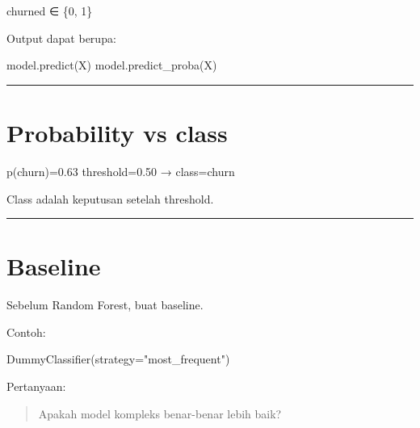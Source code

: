 \documentclass[
  indonesian,
  letterpaper,
  DIV=11,
  numbers=noendperiod]{scrreprt}
\newenvironment{Shaded}{\begin{snugshade}}{\end{snugshade}}
\newcommand{\NormalTok}[1]{\textcolor[rgb]{0.00,0.23,0.31}{#1}}
\newcommand{\OperatorTok}[1]{\textcolor[rgb]{0.37,0.37,0.37}{#1}}
\newcommand{\StringTok}[1]{\textcolor[rgb]{0.13,0.47,0.30}{#1}}
\begin{document}
\begin{Shaded}
\begin{Highlighting}[]
\NormalTok{churned ∈ \{0, 1\}}
\end{Highlighting}
\end{Shaded}

Output dapat berupa:

\begin{Shaded}
\begin{Highlighting}[]
\NormalTok{model.predict(X)}
\NormalTok{model.predict\_proba(X)}
\end{Highlighting}
\end{Shaded}

\begin{center}\rule{0.5\linewidth}{0.5pt}\end{center}

\section{Probability vs class}\label{probability-vs-class}

\begin{Shaded}
\begin{Highlighting}[]
\NormalTok{p(churn)=0.63}
\NormalTok{threshold=0.50}
\NormalTok{→ class=churn}
\end{Highlighting}
\end{Shaded}

Class adalah keputusan setelah threshold.

\begin{center}\rule{0.5\linewidth}{0.5pt}\end{center}

\section{Baseline}\label{baseline}

Sebelum Random Forest, buat baseline.

Contoh:

\begin{Shaded}
\begin{Highlighting}[]
\NormalTok{DummyClassifier(strategy}\OperatorTok{=}\StringTok{"most\_frequent"}\NormalTok{)}
\end{Highlighting}
\end{Shaded}

Pertanyaan:

\begin{quote}
Apakah model kompleks benar-benar lebih baik?
\end{quote}
\end{document}
